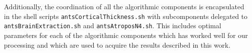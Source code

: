 Additionally, the coordination of all the algorithmic components is
encapsulated in the shell scripts \verb#antsCorticalThickness.sh# with
subcomponents delegated to \verb#antsBrainExtraction.sh# 
and \verb#antsAtroposN4.sh#.  This includes
optimal parameters for each of the algorithmic components which has worked
well for our processing and which are used to acquire the results 
described in this work.

%
%
%
%
%
%
%

